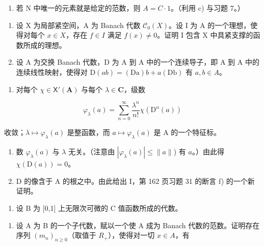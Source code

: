 \begin{enumerate}
\def\labelenumi{\alph{enumi})}
\setcounter{enumi}{3}
\tightlist
\item
  若 N 中唯一的元素就是给定的范数，则 \(A = C \cdot 1\)。（利用 c) 与习题 7。）
\end{enumerate}

\begin{enumerate}
\def\labelenumi{\arabic{enumi})}
\setcounter{enumi}{8}
\item
  设 X 为局部紧空间，A 为 Banach 代数 \(\mathcal{C}_{0}(X)\)。设 I 为 A 的一个理想，使得对每个 \(x \in X\)，存在 \(f \in I\) 满足 \(f(x) \neq 0\)。证明 I 包含 X 中具紧支撑的函数所成的理想。
\item
  设 A 为交换 Banach 代数，D 为 A 到 A 中的一个连续导子，即 A 到 A 中的连续线性映射，使得对 \(\mathrm{D}(ab)=(\mathrm{Da})b+a(\mathrm{Db})\) 有 \(a,b\in A\)。
\end{enumerate}

\begin{enumerate}
\def\labelenumi{\alph{enumi})}
\tightlist
\item
  对每个 \(\chi \in \mathsf{X}'(\mathbf{A})\) 与每个 \(\lambda \in \mathbf{C}\)，级数
\end{enumerate}

\[
\varphi_ {\lambda} (a) = \sum_ {n = 0} ^ {\infty} \frac {\lambda^ {n}}{n !} \chi (\mathrm{D} ^ {n} (a))
\]

收敛；\(\lambda \mapsto \varphi_{\lambda}(a)\) 是整函数，而 \(a \mapsto \varphi_{\lambda}(a)\) 是 A 的一个特征标。

\begin{enumerate}
\def\labelenumi{\alph{enumi})}
\setcounter{enumi}{1}
\item
  数 \(\varphi_{\lambda}(a)\) 与 \(\lambda\) 无关。（注意由 \(|\varphi_{\lambda}(a)| \leqslant \|a\|\)) 有 \(a\)。）由此得 \(\chi(\mathrm{D}(a)) = 0\)。
\item
  D 的像含于 A 的根之中。由此给出 I，第 162 页习题 31 的断言 f) 的一个新证明。
\end{enumerate}

\begin{enumerate}
\def\labelenumi{\arabic{enumi})}
\setcounter{enumi}{10}
\tightlist
\item
  设 B 为 {[}0,1{]} 上无限次可微的 C 值函数所成的代数。
\end{enumerate}

\begin{enumerate}
\def\labelenumi{\alph{enumi})}
\tightlist
\item
  设 A 为 B 的一个子代数，赋以一个使 A 成为 Banach 代数的范数。证明存在序列 \((m_{n})_{n\geqslant0}\)（取值于 \(R_{+}\)），使得对一切 \(x\in A\)，有
\end{enumerate}

